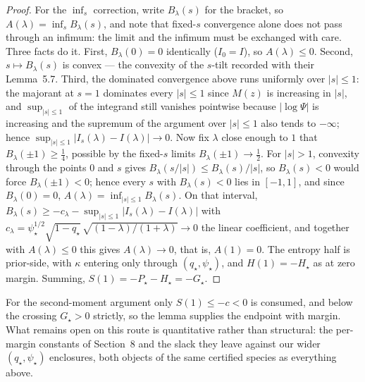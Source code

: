 \begin{proof}
For the $\inf_s$ correction, write $B_\lambda(s)$ for the bracket,
so $A(\lambda)=\inf_s B_\lambda(s)$, and note that fixed-$s$
convergence alone does not pass through an infimum: the limit and
the infimum must be exchanged with care.  Three facts do it.
First, $B_\lambda(0)=0$ identically ($I_0=I$), so $A(\lambda)\le0$.
Second, $s\mapsto B_\lambda(s)$ is convex --- the convexity of the
$s$-tilt recorded with their Lemma~5.7.  Third, the dominated
convergence above runs uniformly over $|s|\le1$: the majorant at
$s=1$ dominates every $|s|\le1$ since $M(z)$ is increasing in
$|s|$, and $\sup_{|s|\le1}$ of the integrand still vanishes
pointwise because $|\log\Psi|$ is increasing and the supremum of
the argument over $|s|\le1$ also tends to $-\infty$; hence
$\sup_{|s|\le1}|I_s(\lambda)-I(\lambda)|\to0$.  Now fix $\lambda$
close enough to $1$ that $B_\lambda(\pm1)\ge\tfrac14$, possible by
the fixed-$s$ limits $B_\lambda(\pm1)\to\tfrac12$.  For $|s|>1$,
convexity through the points $0$ and $s$ gives
$B_\lambda(s/|s|)\le B_\lambda(s)/|s|$, so $B_\lambda(s)<0$ would
force $B_\lambda(\pm1)<0$; hence every $s$ with $B_\lambda(s)<0$
lies in $[-1,1]$, and since $B_\lambda(0)=0$,
$A(\lambda)=\inf_{|s|\le1}B_\lambda(s)$.  On that interval,
$B_\lambda(s)\ge -c_\lambda-\sup_{|s|\le1}|I_s(\lambda)-I(\lambda)|$
with $c_\lambda=\psi_\star^{1/2}\sqrt{1-q_\star}\,
\sqrt{(1-\lambda)/(1+\lambda)}\to0$ the linear coefficient, and
together with $A(\lambda)\le0$ this gives $A(\lambda)\to0$, that
is, $A(1)=0$.  The entropy half is prior-side, with
$\kappa$ entering only through $(q_\star,\psi_\star)$, and
$H(1)=-H_\star$ as at zero margin.  Summing,
$S(1)=-P_\star-H_\star=-G_\star$.
\end{proof}

For the second-moment argument only $S(1)\le-c<0$ is consumed, and
below the crossing $G_\star>0$ strictly, so the lemma supplies the
endpoint with margin.  What remains open on this route is
quantitative rather than structural: the per-margin constants of
Section~8 and the slack they leave against our wider
$(q_\star,\psi_\star)$ enclosures, both objects of the same
certified species as everything above.
